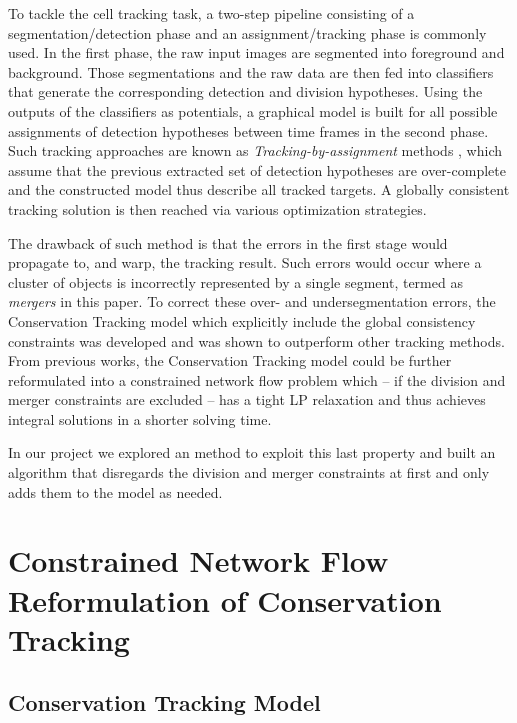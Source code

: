 \documentclass[10pt,twocolumn,letterpaper]{article}
\begin{document}
To tackle the cell tracking task, a two-step pipeline \cite{yilmaz2006object} consisting of a segmentation/detection phase and an assignment/tracking phase is commonly used. In the first phase, the raw input images are segmented into foreground and background. Those segmentations and the raw data are then fed into classifiers that generate the corresponding detection and division hypotheses. Using the outputs of the classifiers as potentials, a graphical model is built for all possible assignments of  detection hypotheses between time frames in the second phase. Such tracking approaches are known as \textit{Tracking-by-assignment} methods \cite{bise2011reliable,padfield2011coupled}, which assume that the previous extracted set of detection hypotheses are over-complete and the constructed model thus describe all tracked targets. A globally consistent tracking solution is then reached via various optimization strategies.

The drawback of such method is that the errors in the first stage would propagate to, and warp, the tracking result. Such errors would occur where a cluster of objects is incorrectly represented by a single segment, termed as \textit{mergers} in this paper. To correct these over- and undersegmentation errors, the Conservation Tracking model \cite{schiegg2013conservation} which explicitly include the global consistency constraints was developed and was shown to outperform other tracking methods. From previous works, the Conservation Tracking model could be further reformulated into a constrained network flow problem which -- if the division and merger constraints are excluded -- has a tight LP relaxation and thus achieves integral solutions in a shorter solving time.

In our project we explored an method to exploit this last property and built an algorithm that disregards the division and merger constraints at first and only adds them to the model as needed.

\section{Constrained Network Flow Reformulation of Conservation Tracking}


\subsection{Conservation Tracking Model}
\end{document}
